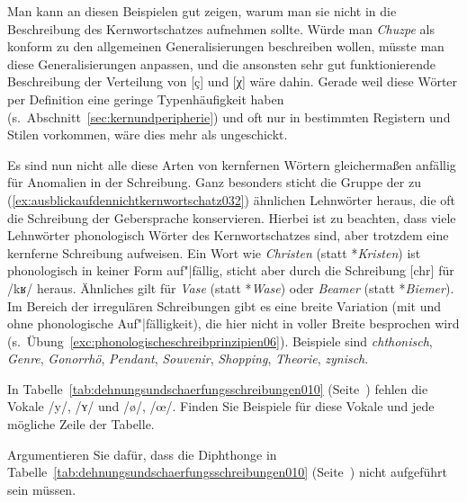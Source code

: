 Man kann an diesen Beispielen gut zeigen, warum man sie nicht in die Beschreibung des Kernwortschatzes aufnehmen sollte.
Würde man \textit{Chuzpe} \zB als konform zu den allgemeinen Generalisierungen beschreiben wollen, müsste man diese Generalisierungen anpassen, und die ansonsten sehr gut funktionierende Beschreibung der Verteilung von [ç] und [χ] wäre dahin.
Gerade weil diese Wörter per Definition eine geringe Typenhäufigkeit haben (s.\ Abschnitt~\ref{sec:kernundperipherie}) und oft nur in bestimmten Registern und Stilen vorkommen, wäre dies mehr als ungeschickt.

Es sind nun nicht alle diese Arten von kernfernen Wörtern gleichermaßen anfällig für Anomalien in der Schreibung.
Ganz besonders sticht die Gruppe der zu (\ref{ex:ausblickaufdennichtkernwortschatz032}) ähnlichen Lehnwörter heraus, die oft die Schreibung der Gebersprache konservieren.
Hierbei ist zu beachten, dass viele Lehnwörter phonologisch Wörter des Kernwortschatzes sind, aber trotzdem eine kernferne Schreibung aufweisen.
Ein Wort wie \textit{Christen} (statt *\textit{Kristen}) ist phonologisch in keiner Form auf"|fällig, sticht aber durch die Schreibung [chr] für /kʁ/ heraus.
Ähnliches gilt für \textit{Vase} (statt *\textit{Wase}) oder \textit{Beamer} (statt *\textit{Biemer}).
Im Bereich der irregulären Schreibungen gibt es eine breite Variation (mit und ohne phonologische Auf"|fälligkeit), die hier nicht in voller Breite besprochen wird (s.\ Übung~\ref{exc:phonologischeschreibprinzipien06}).
Beispiele sind \textit{chthonisch}, \textit{Genre}, \textit{Gonorrhö}, \textit{Pendant}, \textit{Souvenir}, \textit{Shopping}, \textit{Theorie}, \textit{zynisch}.


\Uebungen

 \label{exc:phonologischeschreibprinzipien01} In Tabelle~\ref{tab:dehnungsundschaerfungsschreibungen010} (Seite~\pageref{tab:dehnungsundschaerfungsschreibungen010}) fehlen die Vokale /y/, /ʏ/ und /ø/, /œ/.
Finden Sie Beispiele für diese Vokale und jede mögliche Zeile der Tabelle.

 \label{exc:phonologischeschreibprinzipien02} Argumentieren Sie dafür, dass die Diphthonge in Tabelle~\ref{tab:dehnungsundschaerfungsschreibungen010} (Seite~\pageref{tab:dehnungsundschaerfungsschreibungen010}) nicht aufgeführt sein müssen.

